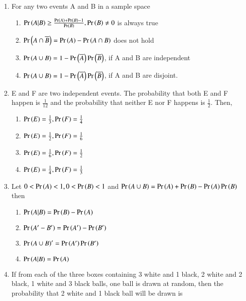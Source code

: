\documentclass[journal,12pt,twocolumn,article]{IEEEtran}
\theoremstyle{remark}
\begin{document}
\begin{enumerate}[start = 3]
\item For any two events A and B in a sample space
\hfill{}
\begin{enumerate}
\item $\Pr\left(A|B\right)\geq \frac{\Pr\left(A\right)+\Pr\left(B\right)-1}{\Pr\left(B\right)}, \Pr\left(B\right)\neq 0$ is always true
\item $\Pr\left(A\cap \overline{B}\right)=\Pr\left(A\right)-\Pr\left(A\cap B\right)$ does not hold
\item $\Pr\left(A\cup B\right)=1-\Pr\left(\overline{A}\right)\Pr\left(\overline{B}\right)$, if A and B are independent
\item $\Pr\left(A\cup B\right)=1-\Pr\left(\overline{A}\right)\Pr\left(\overline{B}\right)$, if A and B are disjoint.
\end{enumerate}
\item E and F are two independent events. The probability that both E and F happen is $\frac{1}{12}$ and the probability that neither E nor F happens is $\frac{1}{2}$. Then,
\hfill{}
\begin{enumerate}
\item $\Pr\left(E\right)=\frac{1}{3},\Pr\left(F\right)=\frac{1}{4}$
\item $\Pr\left(E\right)=\frac{1}{2},\Pr\left(F\right)=\frac{1}{6}$
\item $\Pr\left(E\right)=\frac{1}{6},\Pr\left(F\right)=\frac{1}{2}$
\item $\Pr\left(E\right)=\frac{1}{4},\Pr\left(F\right)=\frac{1}{3}$
\end{enumerate}
\item Let $0<\Pr\left(A\right)<1,0<\Pr\left(B\right)<1$ and $\Pr\left(A\cup B\right)=\Pr\left(A\right)+\Pr\left(B\right)-\Pr\left(A\right)\Pr\left(B\right)$ then
\hfill{}
\begin{enumerate}
\item $\Pr\left(A|B\right)=\Pr\left(B\right)-\Pr\left(A\right)$
\item $\Pr\left(A'-B'\right)=\Pr\left(A'\right)-\Pr\left(B'\right)$
\item $\Pr\left(A\cup B\right)'=\Pr\left(A'\right)\Pr\left(B'\right)$
\item $\Pr\left(A|B\right)=\Pr\left(A\right)$
\end{enumerate}
\item If from each of the three boxes containing 3 white and 1 black, 2 white and 2 black, 1 white and 3 black balls, one ball is drawn at random, then the probability that 2 white and 1 black ball will be drawn is
\hfill{}
\begin{enumerate}
\end{enumerate}
\end{enumerate}
\end{document}
